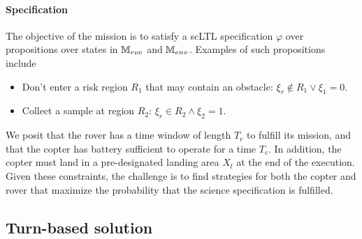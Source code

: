 \documentclass[conference]{IEEEtran}
\begin{document}
\paragraph{Specification}

The objective of the mission is to satisfy a scLTL specification $\varphi$ over propositions over states in $\mathbb{M}_{rov}$ and $\mathbb{M}_{env}$. Examples of such propositions include
\begin{itemize}
  \item Don't enter a risk region $R_1$ that may contain an obstacle: $\xi_r \not  \in R_1 \lor \xi_1 = 0$.
  \item Collect a sample at region $R_2$: $\xi_r \in R_2 \land \xi_2 = 1$.
\end{itemize}

We posit that the rover has a time window of length $T_r$ to fulfill its mission, and that the copter has battery sufficient to operate for a time $T_c$. In addition, the copter must land in a pre-designated landing area $X_l$ at the end of the execution. Given these constraints, the challenge is to find strategies for both the copter and rover that maximize the probability that the science specification is fulfilled.


\subsection{Turn-based solution}
\end{document}
